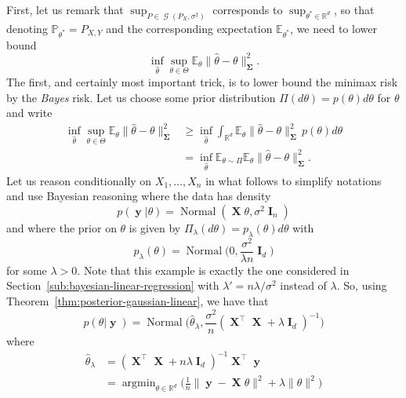\documentclass[
	fontsize=11pt, %
	twoside=false, %
	numbers=noenddot, %
]{kaobook}
\DeclareMathOperator{\cG}{{\mathcal G}}
\DeclareMathOperator{\bI}{{\boldsymbol I}}
\DeclareMathOperator{\bX}{{\boldsymbol X}}
\DeclareMathOperator{\by}{{\boldsymbol y}}
\DeclareMathOperator{\bSigma}{\boldsymbol \Sigma}
\DeclareMathOperator{\nor}{Normal}
\DeclareMathOperator*{\argmin}{argmin}
\renewcommand{\P}{\mathbb P}
\newcommand{\E}{\mathbb E}
\newcommand{\R}{\mathbb R}
\newcommand{\wh}{\widehat}
\newcommand{\norm}[1]{\| #1 \|}
\begin{document}
First, let us remark that $\sup_{P \in \cG(P_X, \sigma^2)}$ corresponds to $\sup_{\theta^* \in \R^d}$, so that denoting $\P_{\theta^*} = P_{X, Y}$ and the corresponding expectation $\E_{\theta^*}$, we need to lower bound
\begin{equation*}
	\inf_{\wh \theta} \sup_{\theta \in \Theta} \E_\theta \norm{\wh \theta - \theta}_{\bSigma}^2.
\end{equation*}
The first, and certainly most important trick, is to lower bound the minimax risk by the \emph{Bayes} risk. 
Let us choose some prior distribution $\Pi(d \theta) = p(\theta) d \theta$ for $\theta$ and write
\begin{align}
	\nonumber
	\inf_{\wh \theta} \sup_{\theta \in \Theta} \E_\theta \norm{\wh \theta - \theta}_{\bSigma}^2 
	&\geq \inf_{\wh \theta} \int_{\R^d} \E_\theta \norm{\wh \theta - \theta}_{\bSigma}^2 \, p(\theta) d \theta \\
	\label{eq:ls-bayes-risk}
	&= \inf_{\wh \theta} \E_{\theta \sim \Pi} \E_\theta \norm{\wh \theta - \theta}_{\bSigma}^2.
\end{align}
Let us reason conditionally on $X_1, \ldots, X_n$ in what follows to simplify notations and use Bayesian reasoning where the data has density 
\begin{equation*}
	p(\by | \theta) = \nor(\bX \theta, \sigma^2 \bI_n)
\end{equation*}
and where the prior on $\theta$ is given by $\Pi_\lambda(d \theta) = p_\lambda(\theta) d\theta$ with
\begin{equation*}
	p_\lambda(\theta) = \nor\Big(0, \frac{\sigma^2}{\lambda n} \bI_d \Big)
\end{equation*}
for some $\lambda > 0$. Note that this example is exactly the one considered in Section~\ref{sub:bayesian-linear-regression} with $\lambda' = n \lambda / \sigma^2$ instead of $\lambda$.
So, using Theorem~\ref{thm:posterior-gaussian-linear}, we have that
\begin{equation*}
	p(\theta | \by) = \nor\Big( \wh \theta_\lambda, \frac{\sigma^2}{n} (\bX^\top \bX + \lambda \bI_d)^{-1} \Big)
\end{equation*}
where
\begin{equation}
	\label{eq:ridge-estimator-lower-bound}
	\begin{split}
		\wh \theta_\lambda &= (\bX^\top \bX + n \lambda \bI_d)^{-1} \bX^\top \by \\
		&= \argmin_{\theta \in \R^d} \Big( \frac 1n \norm{\by - \bX \theta}^2 + \lambda \norm{\theta}^2 \Big)		
	\end{split}
\end{equation}
\end{document}
